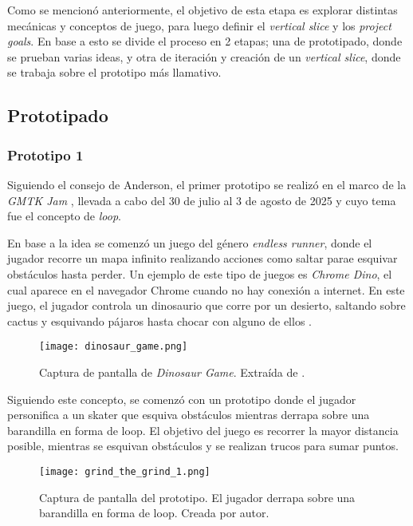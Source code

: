 \par Como se mencionó anteriormente, el objetivo de esta etapa es explorar distintas mecánicas y conceptos de juego, para luego definir el \textit{vertical slice} y los \textit{project goals}. En base a esto se divide el proceso en 2 etapas; una de prototipado, donde se prueban varias ideas, y otra de iteración y creación de un \textit{vertical slice}, donde se trabaja sobre el prototipo más llamativo.
%
%
\subsection{Prototipado}
\subsubsection{Prototipo 1}
\par Siguiendo el consejo de Anderson, el primer prototipo se realizó en el marco de la \textit{GMTK Jam} \cite{GMTKGameJam}, llevada a cabo del 30 de julio al 3 de agosto de 2025 y cuyo tema fue el concepto de \textit{loop}.
\par En base a la idea se comenzó un juego del género \textit{endless runner}, donde el jugador recorre un mapa infinito realizando acciones como saltar parae esquivar obstáculos hasta perder. Un ejemplo de este tipo de juegos es \textit{Chrome Dino}, el cual aparece en el navegador Chrome cuando no hay conexión a internet. En este juego, el jugador controla un dinosaurio que corre por un desierto, saltando sobre cactus y esquivando pájaros hasta chocar con alguno de ellos \cite{DinosaurGame2025}.
\begin{figure}[H]
  \centering
  \texttt{[image: dinosaur\_game.png]}
  \caption{Captura de pantalla de \textit{Dinosaur Game}. Extraída de \cite{DinosaurGame2025}.}
  \label{fig:x dinosaur game} 
\end{figure}
\par Siguiendo este concepto, se comenzó con un prototipo donde el jugador personifica a un skater que esquiva obstáculos mientras derrapa sobre una barandilla en forma de loop. El objetivo del juego es recorrer la mayor distancia posible, mientras se esquivan obstáculos y se realizan trucos para sumar puntos.
\begin{figure}[H]
  \centering
  \texttt{[image: grind\_the\_grind\_1.png]}
  \caption{Captura de pantalla del prototipo. El jugador derrapa sobre una barandilla en forma de loop. Creada por autor.}
  \label{fig:x grind the grind 1} 
\end{figure}
